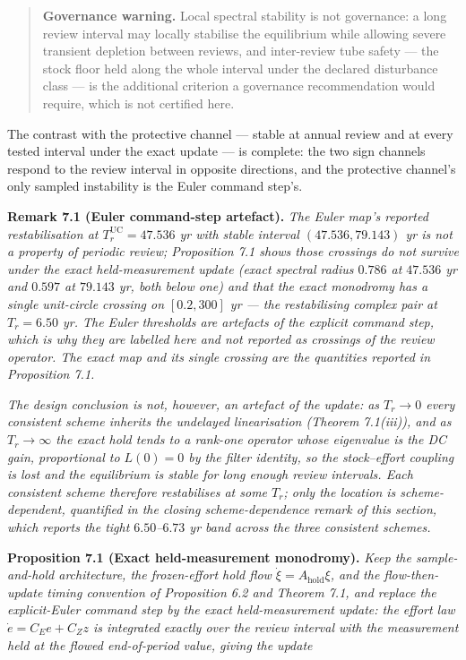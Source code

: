 \documentclass[11pt]{article}
\begin{document}
\begin{quote}
\textbf{Governance warning.} Local spectral stability is not governance:
a long review interval may locally stabilise the equilibrium while
allowing severe transient depletion between reviews, and inter-review
tube safety --- the stock floor held along the whole interval under the
declared disturbance class --- is the additional criterion a governance
recommendation would require, which is not certified here.
\end{quote}

The contrast with the protective channel --- stable at annual review and
at every tested interval under the exact update --- is complete: the two
sign channels respond to the review interval in opposite directions, and
the protective channel's only sampled instability is the Euler command
step's.

\textbf{Remark 7.1 (Euler command-step artefact).} \emph{The Euler map's
reported restabilisation at \(T_r^{\mathrm{UC}} = 47.536\) yr with
stable interval \((47.536, 79.143)\) yr is not a property of periodic
review; Proposition 7.1 shows those crossings do not survive under the
exact held-measurement update (exact spectral radius \(0.786\) at
\(47.536\) yr and \(0.597\) at \(79.143\) yr, both below one) and that
the exact monodromy has a single unit-circle crossing on \([0.2, 300]\)
yr --- the restabilising complex pair at \(T_r = 6.50\) yr. The Euler
thresholds are artefacts of the explicit command step, which is why they
are labelled here and not reported as crossings of the review operator.
The exact map and its single crossing are the quantities reported in
Proposition 7.1.}

\emph{The design conclusion is not, however, an artefact of the update:
as \(T_r \to 0\) every consistent scheme inherits the undelayed
linearisation (Theorem 7.1(iii)), and as \(T_r \to \infty\) the exact
hold tends to a rank-one operator whose eigenvalue is the DC gain,
proportional to \(L(0) = 0\) by the filter identity, so the
stock--effort coupling is lost and the equilibrium is stable for long
enough review intervals. Each consistent scheme therefore restabilises
at some \(T_r\); only the location is scheme-dependent, quantified in
the closing scheme-dependence remark of this section, which reports the
tight \(6.50\)--\(6.73\) yr band across the three consistent schemes.}

\textbf{Proposition 7.1 (Exact held-measurement monodromy).} \emph{Keep
the sample-and-hold architecture, the frozen-effort hold flow
\(\dot\xi = A_{\mathrm{hold}}\xi\), and the flow-then-update timing
convention of Proposition 6.2 and Theorem 7.1, and replace the
explicit-Euler command step by the exact held-measurement update: the
effort law \(\dot e = C_E e + C_Z z\) is integrated exactly over the
review interval with the measurement held at the flowed end-of-period
value, giving the update}
\end{document}
